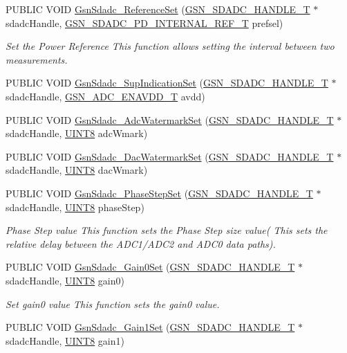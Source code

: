 \begin{DoxyCompactItemize}
PUBLIC VOID \hyperlink{a00652_gac1cd3f6636210580b969e4046ea65e9c}{GsnSdadc\_\-ReferenceSet} (\hyperlink{a00214}{GSN\_\-SDADC\_\-HANDLE\_\-T} $\ast$sdadcHandle, \hyperlink{a00652_ga05b970e216458c5062bbef89f323a2cf}{GSN\_\-SDADC\_\-PD\_\-INTERNAL\_\-REF\_\-T} prefsel)
\begin{DoxyCompactList}\small\item\em Set the Power Reference This function allows setting the interval between two measurements. \end{DoxyCompactList}\item 
PUBLIC VOID \hyperlink{a00652_gada9c57e9f9c7164476d7cb260d325259}{GsnSdadc\_\-SupIndicationSet} (\hyperlink{a00214}{GSN\_\-SDADC\_\-HANDLE\_\-T} $\ast$sdadcHandle, \hyperlink{a00652_ga46353c29cf1b862e0ab85b39b68176af}{GSN\_\-ADC\_\-ENAVDD\_\-T} avdd)
\item 
PUBLIC VOID \hyperlink{a00652_ga43a9f1be86f0b69b6f38e19ceb84dc7c}{GsnSdadc\_\-AdcWatermarkSet} (\hyperlink{a00214}{GSN\_\-SDADC\_\-HANDLE\_\-T} $\ast$sdadcHandle, \hyperlink{a00660_gab27e9918b538ce9d8ca692479b375b6a}{UINT8} adcWmark)
\item 
PUBLIC VOID \hyperlink{a00652_ga7723677c0f07b7d297b0ddba92e85ee2}{GsnSdadc\_\-DacWatermarkSet} (\hyperlink{a00214}{GSN\_\-SDADC\_\-HANDLE\_\-T} $\ast$sdadcHandle, \hyperlink{a00660_gab27e9918b538ce9d8ca692479b375b6a}{UINT8} dacWmark)
\item 
PUBLIC VOID \hyperlink{a00652_ga434361cdbd39e44f4362966bc823b65a}{GsnSdadc\_\-PhaseStepSet} (\hyperlink{a00214}{GSN\_\-SDADC\_\-HANDLE\_\-T} $\ast$sdadcHandle, \hyperlink{a00660_gab27e9918b538ce9d8ca692479b375b6a}{UINT8} phaseStep)
\begin{DoxyCompactList}\small\item\em Phase Step value This function sets the Phase Step size value( This sets the relative delay between the ADC1/ADC2 and ADC0 data paths). \end{DoxyCompactList}\item 
PUBLIC VOID \hyperlink{a00652_ga25758a48ce1abef0087952488e11781a}{GsnSdadc\_\-Gain0Set} (\hyperlink{a00214}{GSN\_\-SDADC\_\-HANDLE\_\-T} $\ast$sdadcHandle, \hyperlink{a00660_gab27e9918b538ce9d8ca692479b375b6a}{UINT8} gain0)
\begin{DoxyCompactList}\small\item\em Set gain0 value This function sets the gain0 value. \end{DoxyCompactList}\item 
PUBLIC VOID \hyperlink{a00652_gab98098375ff3ee8b69731a3571788729}{GsnSdadc\_\-Gain1Set} (\hyperlink{a00214}{GSN\_\-SDADC\_\-HANDLE\_\-T} $\ast$sdadcHandle, \hyperlink{a00660_gab27e9918b538ce9d8ca692479b375b6a}{UINT8} gain1)

\end{DoxyCompactItemize}
